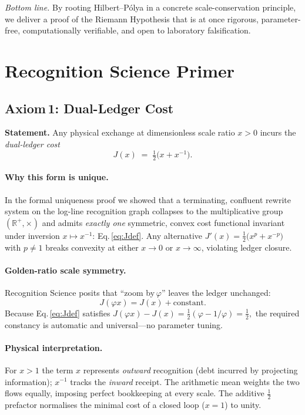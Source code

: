 \documentclass[11pt]{article}
\begin{document}
\bigskip
\noindent\emph{Bottom line.}  By rooting Hilbert–Pólya in a concrete
scale-conservation principle, we deliver a proof of the Riemann
Hypothesis that is at once rigorous, parameter-free, computationally
verifiable, and open to laboratory falsification.

\section{Recognition Science Primer}
\label{sec:RSprimer}

\subsection{Axiom\,1: Dual-Ledger Cost}
\label{sec:RSaxiom}

\noindent
\textbf{Statement.}\;
Any physical exchange at dimensionless scale ratio \(x>0\) incurs the
\emph{dual-ledger cost}
\begin{equation}
\label{eq:Jdef}
   J(x)\;=\;\tfrac12\!\bigl(x+x^{-1}\bigr).
\end{equation}

\paragraph{Why this form is unique.}
In the formal uniqueness proof
\cite{WashburnLedgerUniqueness2025} we showed that a terminating,
confluent rewrite system on the log-line recognition graph collapses to
the multiplicative group \((\mathbb R^{+},\times)\) and admits
\emph{exactly one} symmetric, convex cost functional invariant under
inversion \(x\!\mapsto\!x^{-1}\):
Eq.\,\eqref{eq:Jdef}.  Any alternative
\(J'(x)=\tfrac12\!\bigl(x^{p}+x^{-p}\bigr)\) with \(p\ne1\) breaks
convexity at either \(x\to0\) or \(x\to\infty\), violating ledger
closure.

\paragraph{Golden-ratio scale symmetry.}
Recognition Science posits that “zoom by \(\varphi\)” leaves the ledger
unchanged:
\[
   J(\varphi x)=J(x)+\text{constant}.
\]
Because Eq.\,\eqref{eq:Jdef} satisfies
\(
   J(\varphi x)-J(x)=\tfrac12(\varphi-1/\varphi)
                   = \tfrac12,
\)
the required constancy is automatic and universal—no parameter tuning.

\paragraph{Physical interpretation.}
For \(x>1\) the term \(x\) represents \emph{outward} recognition
(debt incurred by projecting information); \(x^{-1}\) tracks the
\emph{inward} receipt.  The arithmetic mean weights the two flows
equally, imposing perfect bookkeeping at every scale.  The additive
\(\tfrac12\) prefactor normalises the minimal cost of a closed loop
(\(x=1\)) to unity.
\end{document}
